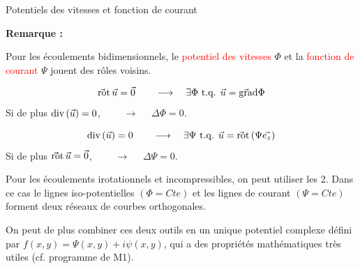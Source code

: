 \begin{frame}{Potentiels des vitesses et fonction de courant}

\small

{\bf Remarque :}

Pour les écoulements bidimensionnels, le \textcolor{red}{potentiel des vitesses} $\Phi$ et la 
 \textcolor{red}{fonction de courant} $\Psi$ jouent des rôles voisins.

 \vspace{.5cm} 
 $$
 \vec{\mbox{\rm ro}}\mbox{\rm t}\, \vec{u}  =  \vec{0} \qquad \longrightarrow \quad \exists   \Phi \mbox{ t.q. } \vec u = \vec{\mbox{\rm gra}}\mbox{\rm d} \Phi
 $$
 Si de plus $\mbox{\rm div}\, (\vec{u}) = 0$, $\qquad  \longrightarrow \quad$ $\Delta \Phi = 0$.


 $$
 \mbox{\rm div}\, ( \vec{u})  =  0 \qquad  \longrightarrow \quad \exists   \Psi \mbox{ t.q. } \vec u = \vec{\mbox{\rm ro}}\mbox{\rm t}\, (\Psi \vec{e_z} )
 $$
 Si de plus $\vec{\mbox{\rm ro}}\mbox{\rm t}\, \vec{u} = \vec{0} $, $\qquad  \longrightarrow \quad$ $\Delta \Psi = 0$.
 
 \vspace{.5cm}
 
 Pour les écoulements irotationnels et incompressibles, on peut utiliser les 2. Dans ce cas le lignes iso-potentielles $(\Phi = Cte)$  et les lignes de courant   $(\Psi = Cte)$ forment 
 deux réseaux de courbes orthogonales.
 
 
 \vspace{.3cm}

 
 On peut de plus combiner ces deux outils en un unique potentiel complexe défini par $f(x,y) = \Psi(x,y) + i \psi(x,y)$, qui a des propriétés mathématiques très utiles (cf. programme de M1).
 
\end{frame}
 


